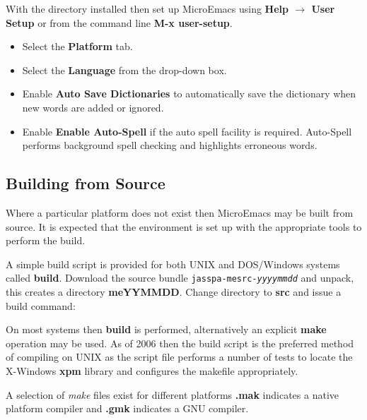 \documentclass[11pt,a4paper,pdftex]{article}
\begin{document}
  With the directory installed then set up MicroEmacs using \textbf{Help
  $\rightarrow$ User Setup} or from the command line \textbf{M-x user-setup}.

  \begin{itemize}
    \item Select the \textbf{Platform} tab.

    \item Select the \textbf{Language} from the drop-down box.

    \item Enable \textbf{Auto Save Dictionaries} to automatically save the
    dictionary when new words are added or ignored.

    \item Enable \textbf{Enable Auto-Spell} if the auto spell facility is
    required. Auto-Spell performs background spell checking and highlights
    erroneous words.

  \end{itemize}

\subsection{Building from Source}

  Where a particular platform does not exist then MicroEmacs may be built from
  source. It is expected that the environment is set up with the appropriate
  tools to perform the build.

  A simple build script is provided for both UNIX and DOS/Windows systems
  called \textbf{build}. Download the source bundle
  \texttt{jasspa-mesrc-\textit{yyyymmdd}} and unpack, this creates a directory
  \textbf{meYYMMDD}. Change directory to \textbf{src} and issue a build
  command:



  On most systems then \textbf{build} is performed, alternatively an explicit
  \textbf{make} operation may be used. As of 2006 then the build script is the
  preferred method of compiling on UNIX as the script file performs a number
  of tests to locate the X-Windows \textbf{xpm} library and configures the
  makefile appropriately.
  
  A selection of \textit{make} files exist for different platforms
  \textbf{.mak} indicates a native platform compiler and \textbf{.gmk}
  indicates a GNU compiler.
\end{document}
